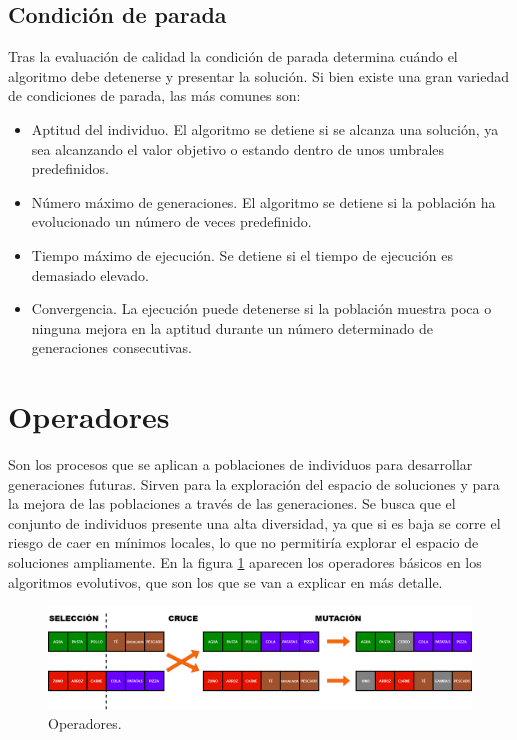 \subsection{Condición de parada}

Tras la evaluación de calidad la condición de parada determina cuándo el algoritmo debe detenerse y presentar la solución. Si bien existe una gran variedad de condiciones de parada, las más comunes son:

\begin{itemize}
  \item Aptitud del individuo. El algoritmo se detiene si se alcanza una solución, ya sea alcanzando el valor objetivo o estando dentro de unos umbrales predefinidos.
  \item Número máximo de generaciones. El algoritmo se detiene si la población ha evolucionado un número de veces predefinido.
  \item Tiempo máximo de ejecución. Se detiene si el tiempo de ejecución es demasiado elevado.
  \item Convergencia. La ejecución puede detenerse si la población muestra poca o ninguna mejora en la aptitud durante un número determinado de generaciones consecutivas.
\end{itemize}
\newpage
\section{Operadores}

Son los procesos que se aplican a poblaciones de individuos para desarrollar generaciones futuras. Sirven para la exploración del espacio de soluciones y para la mejora de las poblaciones a través de las generaciones. Se busca que el conjunto de individuos presente una alta diversidad, ya que si es baja se corre el riesgo de caer en mínimos locales, lo que no permitiría explorar el espacio de soluciones ampliamente. En la figura \ref{fig:operadores} aparecen los operadores básicos en los algoritmos evolutivos, que son los que se van a explicar en más detalle.

\begin{figure}[H]
  \centering
  \includegraphics[width=1\textwidth]{figures/operadores.png}
  \caption{Operadores.}
  \label{fig:operadores}
\end{figure}

